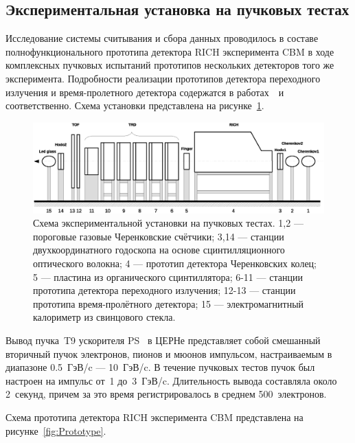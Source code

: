 \subsection{Экспериментальная установка на пучковых тестах}\label{section:secBeamtimeSetup}

Исследование системы считывания и сбора данных проводилось в составе полнофункционального прототипа детектора RICH эксперимента CBM в ходе комплексных пучковых испытаний прототипов нескольких детекторов того же эксперимента. Подробности реализации прототипов детектора переходного излучения и время-пролетного детектора содержатся в работах~\cite{}~и~\cite{} соответственно. Схема установки представлена на рисунке~\ref{fig:Beamtime}.

\begin{figure}
\includegraphics[width=1.0\textwidth]{pictures/9_Beamtime_setup_Full.eps}
\caption{Схема экспериментальной установки на пучковых тестах. 1,2 --- пороговые газовые Черенковские счётчики; 3,14 --- станции двухкоординатного годоскопа на основе сцинтилляционного оптического волокна; 4 --- прототип детектора Черенковских колец; 5 --- пластина из органического сцинтиллятора; 6-11 --- станции прототипа детектора переходного излучения; 12-13 --- станции прототипа время-пролётного детектора; 15 --- электромагнитный калориметр из свинцового стекла.}
\label{fig:Beamtime}
\end{figure}

Вывод пучка~T9 ускорителя PS~\cite{CERNPST9} в ЦЕРНе представляет собой смешанный вторичный пучок электронов, пионов и мюонов импульсом, настраиваемым в диапазоне 0.5~ГэВ/c --- 10~ГэВ/c. В течение пучковых тестов пучок был настроен на импульс от~1 до~3~ГэВ/c. Длительность вывода составляла около 2~секунд, причем за это время регистрировалось в среднем 500~электронов.

Схема прототипа детектора RICH эксперимента CBM представлена на рисунке~\ref{fig:Prototype}.

